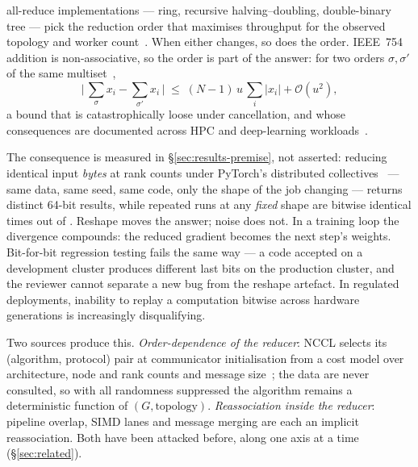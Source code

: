 \documentclass[journal,10pt]{IEEEtran}
\theoremstyle{plain}
\theoremstyle{definition}
\theoremstyle{remark}
\begin{document}
 all-reduce implementations --- ring, recursive
halving--doubling, double-binary tree --- pick the reduction order that
maximises throughput for the observed topology and worker
count~\cite{rabenseifner2004optimization,nccl2018}. When either changes, so
does the order. IEEE~754 addition is non-associative, so the order is part of
the answer: for two orders $\sigma,\sigma'$ of the same
multiset~\cite{higham2002accuracy},
\begin{equation}
  \bigl|\,{\textstyle\sum_\sigma x_i} - {\textstyle\sum_{\sigma'} x_i}\,\bigr|
  \;\leq\; (N-1)\,u\,{\textstyle\sum_i} |x_i| + \mathcal{O}(u^2),
  \label{eq:higham}
\end{equation}
a bound that is catastrophically loose under cancellation, and whose
consequences are documented across HPC and deep-learning
workloads~\cite{shanmugavelu2024}.

The consequence is measured in \S\ref{sec:results-premise}, not asserted:
reducing identical input \emph{bytes} at \GpuWorldSizes{} rank counts under
PyTorch's distributed collectives~\cite{li2020pytorch} --- same data, same
seed, same code, only the shape of the job changing --- returns
\GpuRootsDistinct{} distinct 64-bit results, while repeated runs at any
\emph{fixed} shape are bitwise identical \GpuRepeats{} times out of
\GpuRepeats{}. Reshape moves the answer; noise does not. In a training loop
the divergence compounds: the reduced gradient becomes the next step's
weights. Bit-for-bit regression testing fails the same way --- a code accepted
on a development cluster produces different last bits on the production
cluster, and the reviewer cannot separate a new bug from the reshape
artefact. In regulated deployments, inability to replay a computation bitwise
across hardware generations is increasingly disqualifying.

Two sources produce this. \emph{Order-dependence of the reducer}: NCCL selects
its (algorithm, protocol) pair at communicator initialisation from a cost
model over architecture, node and rank counts and message
size~\cite{nccl2018}; the data are never consulted, so with all randomness
suppressed the algorithm remains a deterministic function of
$(G,\text{topology})$. \emph{Reassociation inside the reducer}: pipeline
overlap, SIMD lanes and message merging are each an implicit reassociation.
Both have been attacked before, along one axis at a time
(\S\ref{sec:related}).
\end{document}
